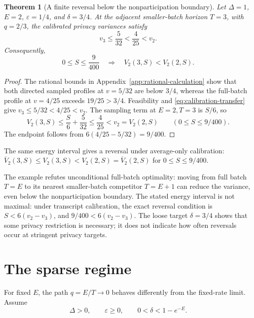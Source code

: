 \documentclass[11pt]{article}
\newtheorem{theorem}{Theorem}[section]
\theoremstyle{remark}
\begin{document}
\begin{theorem}[A finite reversal below the nonparticipation boundary]
\label{thm:strict-interior-counterexample}
Let $\Delta=1$, $E=2$, $\varepsilon=1/4$, and $\delta=3/4$. At the adjacent
smaller-batch horizon $T=3$, with $q=2/3$, the calibrated privacy variances
satisfy
\[
 v_3\leq\frac5{32}<\frac4{25}<v_2.
\]
Consequently,
\[
 0\leq S\leq\frac9{400}
 \quad\Longrightarrow\quad V_2(3,S)<V_2(2,S).
\]
\end{theorem}

\begin{proof}
The rational bounds in Appendix~\ref{app:rational-calculation} show that
both directed sampled profiles at $v=5/32$ are below $3/4$, whereas the
full-batch profile at $v=4/25$ exceeds $19/25>3/4$. Feasibility and
\eqref{eq:calibration-transfer} give
$v_3\leq5/32<4/25<v_2$. The sampling term at $E=2,T=3$ is $S/6$, so
\[
 V_2(3,S)\leq\frac S6+\frac5{32}\leq\frac4{25}<v_2=V_2(2,S)
 \qquad(0\leq S\leq9/400).
\]
The endpoint follows from $6(4/25-5/32)=9/400$.
\end{proof}

The same energy interval gives a reversal under average-only calibration:
$\overline V_2(3,S)\leq V_2(3,S)<V_2(2,S)=\overline V_2(2,S)$ for
$0\leq S\leq9/400$.

The example refutes unconditional full-batch optimality: moving from full
batch $T=E$ to its nearest smaller-batch competitor $T=E+1$ can reduce the
variance, even below the nonparticipation boundary.
The stated energy interval is not maximal: under transcript calibration,
the exact reversal condition is
$S<6(v_2-v_3)$, and $9/400<6(v_2-v_3)$. The loose target $\delta=3/4$ shows
that some privacy restriction is necessary; it does not indicate how often
reversals occur at stringent privacy targets.

\section{The sparse regime}\label{sec:sparse}
For fixed $E$, the path $q=E/T\to0$ behaves differently from the fixed-rate
limit. Assume
\begin{equation}\label{eq:interior}
 \Delta>0,\qquad\varepsilon\geq0,\qquad0<\delta<1-e^{-E}.
\end{equation}
\end{document}
